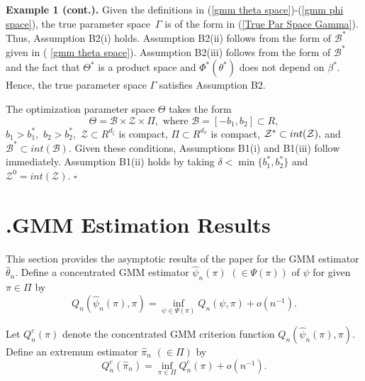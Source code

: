 \documentclass[12pt,titlepage,final,oneside,letterpaper]{article}
\begin{document}
\noindent \textbf{Example 1 (cont.). }Given the definitions in (\ref{gmm
theta space})-(\ref{gmm phi space}), the true parameter space\ $\Gamma $ is
of the form in (\ref{True Par Space Gamma}). Thus, Assumption B2(i) holds.
Assumption B2(ii) follows from the form of $\mathcal{B}^{\ast }$ given in (%
\ref{gmm theta space}). Assumption B2(iii) follows from the form of $%
\mathcal{B}^{\ast }$ and the fact that $\Theta ^{\ast }$ is a product space
and $\Phi ^{\ast }(\theta ^{\ast })$ does not depend on $\beta ^{\ast }.$
Hence, the true parameter space $\Gamma $ satisfies Assumption B2.

The optimization parameter space $\Theta $ takes the form%
\begin{equation}
\Theta =\mathcal{B}\times \mathcal{Z}\times \Pi ,\text{ where }\mathcal{B}%
=[-b_{1},b_{2}]\subset R,
\end{equation}%
$b_{1}>b_{1}^{\ast },$ $b_{2}>b_{2}^{\ast },$ $\mathcal{Z}\subset
R^{d_{\zeta }}$ is compact, $\Pi \subset R^{d_{\pi }}$ is compact, $\mathcal{%
Z}^{\ast }\subset int(\mathcal{Z}),$ and $\mathcal{B}^{\ast }\subset int(%
\mathcal{B}).$ Given these conditions, Assumptions B1(i) and B1(iii) follow
immediately. Assumption B1(ii) holds by taking $\delta <\min \{b_{1}^{\ast
},b_{2}^{\ast }\}$ and $\mathcal{Z}^{0}=int(\mathcal{Z}).$ $\square $

\section{ \hspace{-0.34in}\textbf{.}\hspace{0.2in}GMM Estimation Results 
\label{Estimation Results Sec}}

\setcounter{equation}{0}\hspace{0.25in}This section provides the asymptotic
results of the paper for the GMM estimator $\widehat{\theta }_{n}.$ Define a
concentrated GMM estimator $\widehat{\psi }_{n}(\pi )$ $(\in \Psi (\pi ))$
of $\psi $ for given $\pi \in \Pi $ by%
\begin{equation}
Q_{n}(\widehat{\psi }_{n}(\pi ),\pi )=\inf_{\psi \in \Psi (\pi )}Q_{n}(\psi
,\pi )+o(n^{-1}).  \label{Defn psi}
\end{equation}

Let $Q_{n}^{c}(\pi )$ denote the concentrated GMM criterion function $Q_{n}(%
\widehat{\psi }_{n}(\pi ),\pi ).$ Define an extremum estimator $\widehat{\pi 
}_{n}$ $(\in \Pi )$ by 
\begin{equation}
Q_{n}^{c}(\widehat{\pi }_{n})=\inf_{\pi \in \Pi }Q_{n}^{c}(\pi )+o(n^{-1}).
\label{Defn pihat}
\end{equation}
\end{document}
